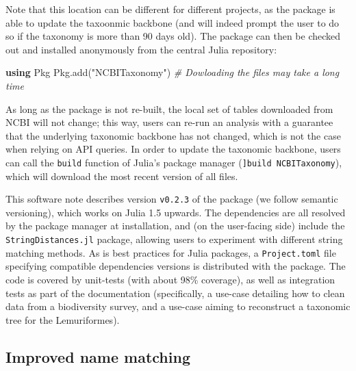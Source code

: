 \documentclass[10pt,oneside]{article}
\newenvironment{Shaded}{\begin{snugshade}}{\end{snugshade}}
\newcommand{\KeywordTok}[1]{\textcolor[rgb]{0.13,0.29,0.53}{\textbf{#1}}}
\newcommand{\StringTok}[1]{\textcolor[rgb]{0.31,0.60,0.02}{#1}}
\newcommand{\CommentTok}[1]{\textcolor[rgb]{0.56,0.35,0.01}{\textit{#1}}}
\newcommand{\NormalTok}[1]{#1}
\begin{document}
Note that this location can be different for different projects, as the
package is able to update the taxoonmic backbone (and will indeed prompt
the user to do so if the taxonomy is more than 90 days old). The package
can then be checked out and installed anonymously from the central Julia
repository:

\begin{Shaded}
\begin{Highlighting}[]
\KeywordTok{using}\NormalTok{ Pkg}
\NormalTok{Pkg.add(}\StringTok{"NCBITaxonomy"}\NormalTok{) }\CommentTok{\# Dowloading the files may take a long time}
\end{Highlighting}
\end{Shaded}

As long as the package is not re-built, the local set of tables
downloaded from NCBI will not change; this way, users can re-run an
analysis with a guarantee that the underlying taxonomic backbone has not
changed, which is not the case when relying on API queries. In order to
update the taxonomic backbone, users can call the \texttt{build}
function of Julia's package manager (\texttt{{]}build\ NCBITaxonomy}),
which will download the most recent version of all files.

This software note describes version \texttt{v0.2.3} of the package (we
follow semantic versioning), which works on Julia 1.5 upwards. The
dependencies are all resolved by the package manager at installation,
and (on the user-facing side) include the \texttt{StringDistances.jl}
package, allowing users to experiment with different string matching
methods. As is best practices for Julia packages, a
\texttt{Project.toml} file specifying compatible dependencies versions
is distributed with the package. The code is covered by unit-tests (with
about 98\% coverage), as well as integration tests as part of the
documentation (specifically, a use-case detailing how to clean data from
a biodiversity survey, and a use-case aiming to reconstruct a taxonomic
tree for the Lemuriformes).

\hypertarget{improved-name-matching}{%
\subsection{Improved name matching}\label{improved-name-matching}}
\end{document}
